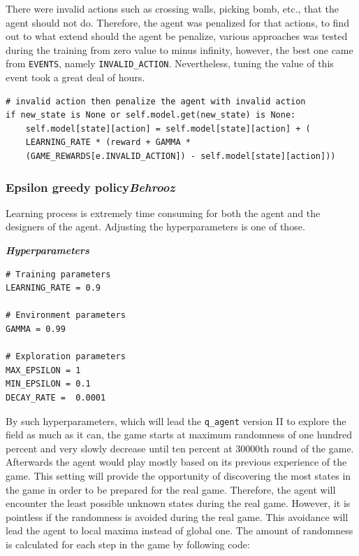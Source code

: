 \documentclass{article}
\begin{document}
There were invalid actions such as crossing walls, picking bomb, etc., that the agent should not do. Therefore, the agent was penalized for that actions, to find out to what extend should the agent be penalize, various approaches was tested during the training from zero value to minus infinity, however, the best one came from \texttt{EVENTS}, namely \texttt{INVALID\_ACTION}. Nevertheless, tuning the value of this event took a great deal of hours.

 \begin{verbatim}
# invalid action then penalize the agent with invalid action
if new_state is None or self.model.get(new_state) is None: 
    self.model[state][action] = self.model[state][action] + ( 
    LEARNING_RATE * (reward + GAMMA * 
    (GAME_REWARDS[e.INVALID_ACTION]) - self.model[state][action]))
 \end{verbatim}

\subsubsection[Epsilon greedy policy]{Epsilon greedy policy{\normalsize \normalfont \it \hfill Behrooz}}

Learning process is extremely time consuming for both the agent and the designers of the agent. Adjusting the hyperparameters is one of those.

\textbf{\textit{Hyperparameters}}

\begin{verbatim}
# Training parameters
LEARNING_RATE = 0.9

# Environment parameters
GAMMA = 0.99

# Exploration parameters
MAX_EPSILON = 1 
MIN_EPSILON = 0.1 
DECAY_RATE =  0.0001
\end{verbatim}

By such hyperparameters, which will lead the \texttt{q\_agent} version II to explore the field as much as it can, the game starts at maximum randomness of one hundred percent and very slowly decrease until ten percent at 30000th round of the game. Afterwards the agent would play mostly based on its previous experience of the game. This setting will provide the opportunity of discovering the most states in the game in order to be prepared for the real game. Therefore, the agent will encounter the least possible unknown states during the real game. However, it is pointless if the randomness is avoided during the real game. This avoidance will lead the agent to local maxima instead of global one. The amount of randomness is calculated for each step in the game by following code:
\end{document}
